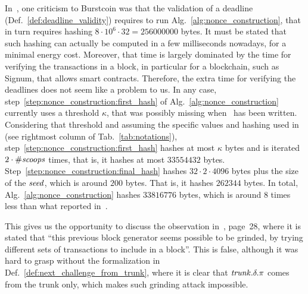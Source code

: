 In~\cite{ParkKFGAP18}, one criticism to Burstcoin was that the validation of a deadline
(Def.~\ref{def:deadline_validity}) requires to run
Alg.~\ref{alg:nonce_construction}, that in turn
requires hashing $8\cdot 10^6\cdot 32=256000000$ bytes.
It must be stated that
such hashing can actually be computed in a few milliseconds nowadays,
for a minimal energy cost. Moreover, that time is largely dominated
by the time for verifying the transactions in a block, in particular
for a blockchain, such as Signum, that allows smart contracts.
Therefore, the extra time for verifying the deadlines does not seem like a problem to us.
In any case, step~\ref{step:nonce_construction:first_hash} of
Alg.~\ref{alg:nonce_construction} currently uses a threshold $\kappa$,
that was possibly missing when~\cite{ParkKFGAP18} has been written.
Considering that threshold and assuming the specific values and hashing
used in~\cite{SignumPlotting} (see rightmost column of Tab.~\ref{tab:notations}),
step~\ref{step:nonce_construction:first_hash}
hashes at most $\kappa$ bytes and is iterated $2\cdot{\#\mathit{scoops}}$ times, that is,
it hashes at most $33554432$ bytes.
Step~\ref{step:nonce_construction:final_hash} hashes $32\cdot 2\cdot 4096$ bytes
plus the size of the ${\mathit{seed}}$, which is around $200$ bytes.
That is, it hashes $262344$ bytes. In total, Alg.~\ref{alg:nonce_construction}
hashes $33816776$ bytes, which is around $8$ times less than what reported
in~\cite{ParkKFGAP18}.

This gives us the opportunity to discuss the observation in~\cite{ParkPAFG15}, page~28,
where it is stated that ``this previous block generator seems possible to be grinded, by trying
different sets of transactions to include in a block''. This is false, although it was
hard to grasp without the formalization in
Def.~\ref{def:next_challenge_from_trunk}, where it is clear that
${\mathit{trunk}}.\delta.\pi$ comes from the trunk only, which makes
such grinding attack impossible.
